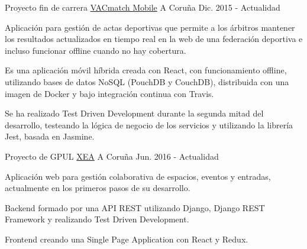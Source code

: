 


\begin{cventries}


\cventry
{Proyecto fin de carrera} %
{\href{https://github.com/vacmatch/vacmatch-mobile}{VACmatch Mobile}} %
{A Coruña} %
{Dic. 2015 - Actualidad} %
{ %
\begin{cvitems}
\item {Aplicación para gestión de actas deportivas que permite a los 
árbitros mantener los resultados actualizados en tiempo real en la web de una 
federación deportiva e incluso funcionar offline cuando no hay cobertura.}
\item {Es una aplicación móvil híbrida creada con React, con funcionamiento 
offline, utilizando bases de datos NoSQL (PouchDB y CouchDB), distribuida con 
una imagen de Docker y bajo integración continua con Travis.}
\item {Se ha realizado Test Driven Development durante la segunda mitad del 
desarrollo, testeando la lógica de negocio de los servicios y utilizando la 
librería Jest, basada en Jasmine.}
\end{cvitems}
}

\cventry
{Proyecto de GPUL} %
{\href{https://github.com/gpul-org/XEA}{XEA}} %
{A Coruña} %
{Jun. 2016 - Actualidad} %
{ %
\begin{cvitems}
\item {Aplicación web para gestión colaborativa de espacios, eventos y 
entradas, actualmente en los primeros pasos de su desarrollo.}
\item {Backend formado por una API REST utilizando Django, Django REST 
Framework y realizando Test Driven Development.}
\item {Frontend creando una Single Page Application con React y Redux.}
\end{cvitems}
}


\end{cventries}